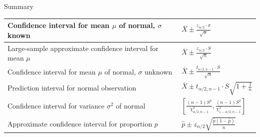 \documentclass{beamer}
\begin{document}
\begin{frame}{Summary}
\begin{center}
\small
\renewcommand*{\arraystretch}{1.5}
\begin{tabular}{p{4.5cm}|p{4cm}}
Confidence interval for mean $\mu$ of normal, $\sigma$ known & 
\vspace{-.25cm}$\displaystyle\overline X \pm \frac{z_{\alpha/2}\cdot\sigma}{\sqrt n}$ \\ \hline
Large-sample approximate confidence interval for mean $\mu$ & 
\vspace{-.25cm}$\displaystyle\overline{X} \pm \frac{z_{\alpha/2}\cdot S}{\sqrt{n}}$ \\ \hline
Confidence interval for mean $\mu$ of normal, $\sigma$ unknown & \vspace{-.25cm}$\displaystyle\overline{X} \pm \frac{t_{\alpha/2,n-1}\cdot S}{\sqrt{n}}$ \\ \hline
Prediction interval for normal observation & 
\vspace{-.25cm}$\displaystyle\overline X \pm t_{\alpha/2,n-1}\cdot S\sqrt{1+\frac1n}$ \\ \hline
Confidence interval for variance $\sigma^2$ of normal &
\vspace{-.35cm}$\displaystyle\left[\frac{(n-1)S^2}{\chi^2_{\alpha/2,n-1}}, \frac{(n-1)S^2}{\chi^2_{1-\alpha/2,n-1}}\right]$ \\ \hline
Approximate confidence interval for proportion $p$ &
\vspace{-.3cm}$\displaystyle\hat p \pm z_{\alpha/2}\sqrt{\frac{\hat p(1-\hat p)}n}$
\end{tabular}
\end{center}
\end{frame}

%


\end{document}
